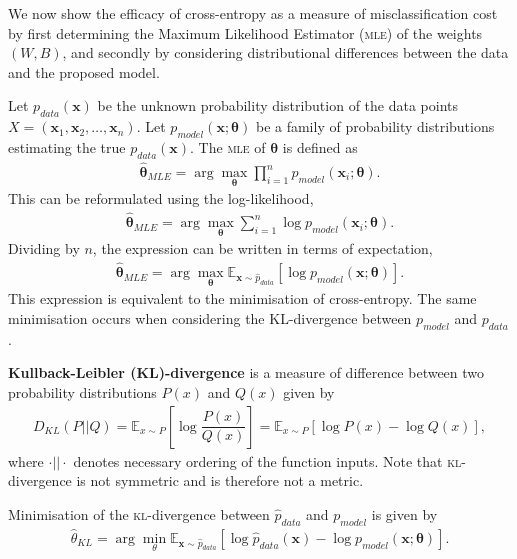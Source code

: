 We now show the efficacy of cross-entropy as a measure of misclassification cost by first determining the Maximum Likelihood Estimator (\textsc{mle}) of the weights $(W, B)$, and secondly by considering distributional differences between the data and the proposed model.

Let ${p}_{data}(\mathbf{x})$ be the unknown probability distribution of the data points \\${X = (\mathbf{x}_1, \mathbf{x}_2, \ldots, \mathbf{x}_n)}$. Let $p_{model}(\mathbf{x}; \mathbf{\theta})$ be a family of probability distributions estimating the true $p_{data}(\mathbf{x})$. The \textsc{mle} of $\mathbf{\theta}$ is defined as
\begin{align*}
	\hat{\mathbf{\theta}}_{MLE} = \arg\max_{\mathbf{\theta}}\prod_{i=1}^np_{model}(\mathbf{x}_i;\mathbf{\theta}).
\end{align*}
This can be reformulated using the log-likelihood,
\begin{align*}
	\hat{\mathbf{\theta}}_{MLE} = \arg\max_{\mathbf{\theta}}\sum_{i=1}^n\log p_{model}(\mathbf{x}_i;\mathbf{\theta}).
\end{align*}
Dividing by $n$, the expression can be written in terms of expectation,
\begin{align}\label{nnets-mle-eq}
	\hat{\mathbf{\theta}}_{MLE} = \arg\max_{\mathbf{\theta}}\mathbb{E}_{\mathbf{x}\sim \hat{p}_{data}}\left[\log p_{model}(\mathbf{x}; \mathbf{\theta})\right].
\end{align}
This expression is equivalent to the minimisation of cross-entropy. The same minimisation occurs when considering the KL-divergence between $p_{model}$ and $p_{data}$.

\begin{definition}
	\textbf{Kullback-Leibler (KL)-divergence} is a measure of difference between two probability distributions $P(x)$ and $Q(x)$ given by
	\begin{align*}
		D_{KL}(P||Q) = \mathbb{E}_{x\sim P}\left[\log\dfrac{P(x)}{Q(x)}\right] = \mathbb{E}_{x\sim P}[\log P(x) - \log Q(x)],
	\end{align*}
	where $\cdot||\cdot$ denotes necessary ordering of the function inputs. Note that \textsc{kl}-divergence is not symmetric and is therefore not a metric.	
\end{definition}

Minimisation of the \textsc{kl}-divergence between $\hat{p}_{data}$ and $p_{model}$ is given by
\begin{align}\label{nnets-kl-eq}
	\hat{\theta}_{KL} = \arg\min_\theta\mathbb{E}_{\mathbf{x}\sim\hat{p}_{data}}\left[\log \hat{p}_{data}(\mathbf{x}) - \log p_{model}(\mathbf{x};\mathbf{\theta})\right].
\end{align}

